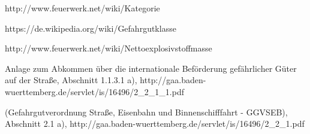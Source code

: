 \documentclass[10pt,landscape]{article}
\begin{document}
\begin{multicols}{3}
\begin{thebibliography}{9}
http://www.feuerwerk.net/wiki/Kategorie

https://de.wikipedia.org/wiki/Gefahrgutklasse

http://www.feuerwerk.net/wiki/Nettoexplosivstoffmasse

Anlage zum Abkommen über die internationale Beförderung gefährlicher Güter auf der Straße, Abschnitt 1.1.3.1 a), 
http://gaa.baden-wuerttemberg.de/servlet/is/16496/2\_2\_1\_1.pdf

(Gefahrgutverordnung Straße, Eisenbahn und Binnenschifffahrt - GGVSEB), Abschnitt 2.1 a),
http://gaa.baden-wuerttemberg.de/servlet/is/16496/2\_2\_1.pdf


\end{thebibliography}

\end{multicols}
\end{document}
